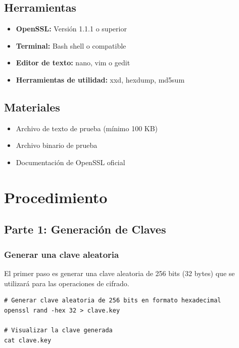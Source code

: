 \documentclass[11pt,a4paper]{article}
\begin{document}
\subsection{Herramientas}
\begin{itemize}
    \item \textbf{OpenSSL:} Versión 1.1.1 o superior
    \item \textbf{Terminal:} Bash shell o compatible
    \item \textbf{Editor de texto:} nano, vim o gedit
    \item \textbf{Herramientas de utilidad:} xxd, hexdump, md5sum
\end{itemize}

\subsection{Materiales}
\begin{itemize}
    \item Archivo de texto de prueba (mínimo 100 KB)
    \item Archivo binario de prueba
    \item Documentación de OpenSSL oficial
\end{itemize}

\section{Procedimiento}

\subsection{Parte 1: Generación de Claves}

\subsubsection{Generar una clave aleatoria}

El primer paso es generar una clave aleatoria de 256 bits (32 bytes) que se utilizará para las operaciones de cifrado.

\begin{lstlisting}[caption={Generación de clave aleatoria de 256 bits}]
# Generar clave aleatoria de 256 bits en formato hexadecimal
openssl rand -hex 32 > clave.key

# Visualizar la clave generada
cat clave.key
\end{lstlisting}
\end{document}
